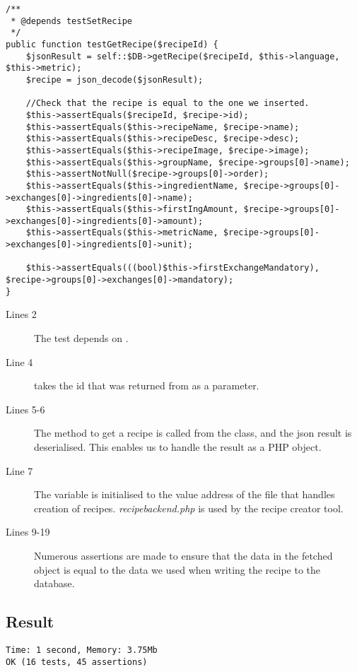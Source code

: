 \begin{lstlisting}[language=phpstyle]
/**
 * @depends testSetRecipe
 */
public function testGetRecipe($recipeId) {
    $jsonResult = self::$DB->getRecipe($recipeId, $this->language, $this->metric);
    $recipe = json_decode($jsonResult);

    //Check that the recipe is equal to the one we inserted.
    $this->assertEquals($recipeId, $recipe->id);
    $this->assertEquals($this->recipeName, $recipe->name);
    $this->assertEquals($this->recipeDesc, $recipe->desc);
    $this->assertEquals($this->recipeImage, $recipe->image);
    $this->assertEquals($this->groupName, $recipe->groups[0]->name);
    $this->assertNotNull($recipe->groups[0]->order);
    $this->assertEquals($this->ingredientName, $recipe->groups[0]->exchanges[0]->ingredients[0]->name);
    $this->assertEquals($this->firstIngAmount, $recipe->groups[0]->exchanges[0]->ingredients[0]->amount);
    $this->assertEquals($this->metricName, $recipe->groups[0]->exchanges[0]->ingredients[0]->unit);

    $this->assertEquals(((bool)$this->firstExchangeMandatory), $recipe->groups[0]->exchanges[0]->mandatory);
}
\end{lstlisting}%
\begin{description}
\item[Lines 2] The test depends on .
\item[Line 4]  takes the id that was returned from  as a parameter.
\item[Lines 5-6] The method to get a recipe is called from the  class, and the \ac{json} result is deserialised. This enables us to handle the result as a PHP object.
\item[Line 7] The  variable is initialised to the value address of the file that handles creation of recipes. \textit{recipebackend.php} is used by the recipe creator tool.%
\item[Lines 9-19] Numerous assertions are made to ensure that the data in the fetched object is equal to the data we used when writing the recipe to the database.
\end{description}

\subsection*{Result}
\begin{lstlisting}[numbers=none, basicstyle=\ttfamily, caption={The result of the PHPUnit test.}]
Time: 1 second, Memory: 3.75Mb
OK (16 tests, 45 assertions)
\end{lstlisting}

